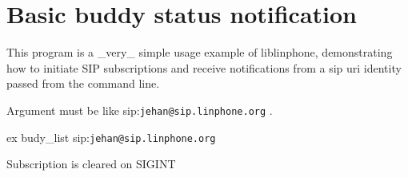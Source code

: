 \section{\-Basic buddy status notification}
\label{group__buddy__tutorials}
\-This program is a \-\_\-very\-\_\- simple usage example of liblinphone, demonstrating how to initiate \-S\-I\-P subscriptions and receive notifications from a sip uri identity passed from the command line. \par
\-Argument must be like sip\-:{\tt jehan@sip.\-linphone.\-org} . \par
 ex budy\-\_\-list sip\-:{\tt jehan@sip.\-linphone.\-org} \par
\-Subscription is cleared on \-S\-I\-G\-I\-N\-T \par
 
